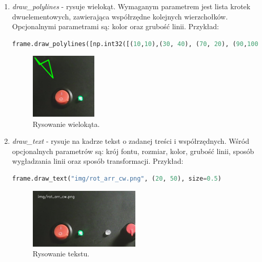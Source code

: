 \documentclass[12pt,twoside,polish]{article}
\begin{document}
\begin{enumerate}[label=\alph*), leftmargin=1.25cm]
\item \emph{draw\_polylines} - rysuje wielokąt. Wymaganym parametrem jest lista krotek dwuelementowych, zawierająca współrzędne kolejnych wierzchołków. Opcjonalnymi parametrami są: kolor oraz grubość linii. Przykład:
\begin{lstlisting}[language=Python]
frame.draw_polylines([np.int32([(10,10),(30, 40), (70, 20), (90,100)])], color=(0, 255, 0))
\end{lstlisting}
\begin{figure}[h]
	\centering
	\includegraphics[width=0.3\textwidth]{draw_poly}
	\caption{Rysowanie wielokąta.}
\end{figure}

\item \emph{draw\_text} - rysuje na kadrze tekst o zadanej treści i współrzędnych. Wśród opcjonalnych parametrów są: krój fontu, rozmiar, kolor, grubość linii, sposób wygładzania linii  oraz sposób transformacji. Przykład:
\begin{lstlisting}[language=Python]
frame.draw_text("img/rot_arr_cw.png", (20, 50), size=0.5)
\end{lstlisting}
\begin{figure}[h]
	\centering
	\includegraphics[width=0.5\textwidth]{draw_text}
	\caption{Rysowanie tekstu.}
\end{figure}


\end{enumerate}
\end{document}
